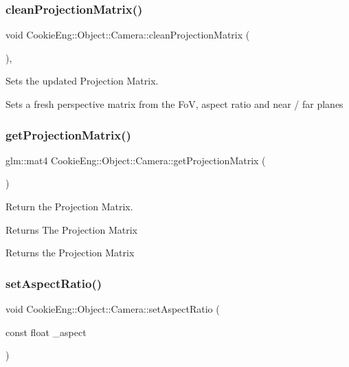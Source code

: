 \subsubsection{\texorpdfstring{clean\+Projection\+Matrix()}{cleanProjectionMatrix()}}
{\footnotesize\ttfamily void Cookie\+Eng\+::\+Object\+::\+Camera\+::clean\+Projection\+Matrix (\begin{DoxyParamCaption}{ }\end{DoxyParamCaption})\hspace{0.3cm}{\ttfamily [inline]}, {\ttfamily [protected]}}



Sets the updated Projection Matrix. 

Sets a fresh perspective matrix from the FoV, aspect ratio and near / far planes \mbox{\label{class_cookie_eng_1_1_object_1_1_camera_afa69ef269138610423e2dc8707720500}} 
\subsubsection{\texorpdfstring{get\+Projection\+Matrix()}{getProjectionMatrix()}}
{\footnotesize\ttfamily glm\+::mat4 Cookie\+Eng\+::\+Object\+::\+Camera\+::get\+Projection\+Matrix (\begin{DoxyParamCaption}{ }\end{DoxyParamCaption})\hspace{0.3cm}{\ttfamily [inline]}}



Return the Projection Matrix. 

\begin{DoxyReturn}{Returns}
The Projection Matrix
\end{DoxyReturn}
Returns the Projection Matrix \mbox{\label{class_cookie_eng_1_1_object_1_1_camera_a2a86235e64f591e8c812f1d69be30a94}} 
\subsubsection{\texorpdfstring{set\+Aspect\+Ratio()}{setAspectRatio()}}
{\footnotesize\ttfamily void Cookie\+Eng\+::\+Object\+::\+Camera\+::set\+Aspect\+Ratio (\begin{DoxyParamCaption}\item[{const float}]{\+\_\+aspect }\end{DoxyParamCaption})\hspace{0.3cm}{\ttfamily [inline]}}



